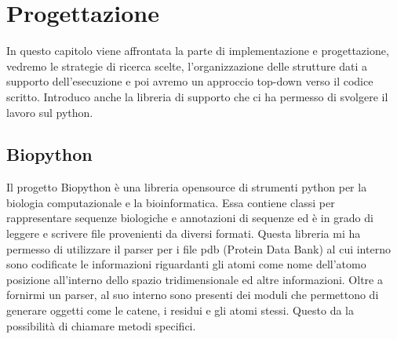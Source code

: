 \chapter{Progettazione}\label{chapter:progettazione}

In questo capitolo viene affrontata la parte di implementazione e progettazione, vedremo le strategie di ricerca scelte, l'organizzazione delle strutture dati a supporto dell'esecuzione e poi avremo un approccio top-down verso il codice scritto. Introduco anche la libreria di supporto che ci ha permesso di svolgere il lavoro sul python.

\section{Biopython}\label{sec:Biopython}
Il progetto Biopython è una libreria opensource \cite{BioPythonManual} di strumenti python per la biologia computazionale e la bioinformatica. Essa contiene classi per rappresentare sequenze biologiche e annotazioni di sequenze ed è in grado di leggere e scrivere file provenienti da diversi formati. 
Questa libreria mi ha permesso di utilizzare il parser per i file pdb (Protein Data Bank) al cui interno sono codificate le informazioni riguardanti gli atomi come nome dell'atomo posizione all'interno dello spazio tridimensionale ed altre informazioni. Oltre a fornirmi un parser, al suo interno sono presenti dei moduli che permettono di generare oggetti come le catene, i residui e gli atomi stessi.
Questo da la possibilità di chiamare metodi specifici.  

